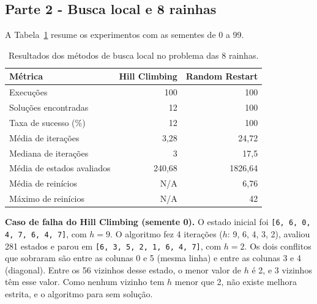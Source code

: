 \documentclass[12pt]{article}
\begin{document}
\subsection{Parte 2 - Busca local e 8 rainhas}\label{sec:queens}
A Tabela~\ref{tab:queens} resume os experimentos com as sementes de 0 a 99.

\begin{table}[H]
\centering
\caption{Resultados dos métodos de busca local no problema das 8 rainhas.}
\label{tab:queens}
\begin{tabularx}{\textwidth}{Xrr}
\toprule
Métrica & Hill Climbing & Random Restart \\
\midrule
Execuções & 100 & 100 \\
Soluções encontradas & 12 & 100 \\
Taxa de sucesso (\%) & 12 & 100 \\
Média de iterações & 3,28 & 24,72 \\
Mediana de iterações & 3 & 17,5 \\
Média de estados avaliados & 240,68 & 1826,64 \\
Média de reinícios & N/A & 6,76 \\
Máximo de reinícios & N/A & 42 \\
\bottomrule
\end{tabularx}
\end{table}

\textbf{Caso de falha do Hill Climbing (semente 0).} O estado inicial foi \texttt{[6, 6, 0, 4, 7, 6, 4, 7]}, com $h = 9$. O algoritmo fez 4 iterações ($h$: 9, 6, 4, 3, 2), avaliou 281 estados e parou em \texttt{[6, 3, 5, 2, 1, 6, 4, 7]}, com $h = 2$. Os dois conflitos que sobraram são entre as colunas 0 e 5 (mesma linha) e entre as colunas 3 e 4 (diagonal). Entre os 56 vizinhos desse estado, o menor valor de $h$ é 2, e 3 vizinhos têm esse valor. Como nenhum vizinho tem $h$ menor que 2, não existe melhora estrita, e o algoritmo para sem solução.
\end{document}
